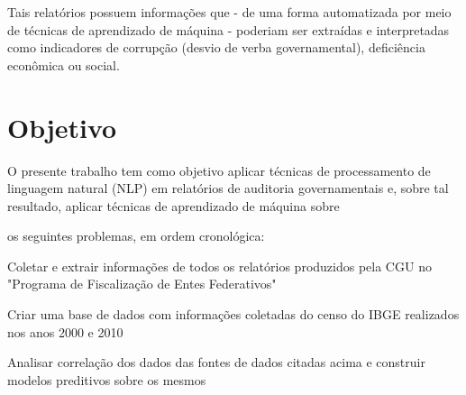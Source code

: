Tais relatórios possuem informações que - de uma forma automatizada por meio de técnicas de aprendizado de máquina - poderiam ser extraídas e interpretadas como indicadores de corrupção (desvio de verba governamental), deficiência econômica ou social.

\section{Objetivo}
\label{sec:objetivo}

O presente trabalho tem como objetivo aplicar técnicas de processamento de linguagem natural (NLP) em relatórios de auditoria governamentais e, sobre tal resultado, aplicar técnicas de aprendizado de máquina sobre 

  os seguintes problemas, em ordem cronológica:

Coletar e extrair informações de todos os relatórios produzidos pela CGU no "Programa de Fiscalização de Entes Federativos"

Criar uma base de dados com informações coletadas do censo do IBGE realizados nos anos 2000 e 2010

Analisar correlação dos dados das fontes de dados citadas acima e construir modelos preditivos sobre os mesmos












